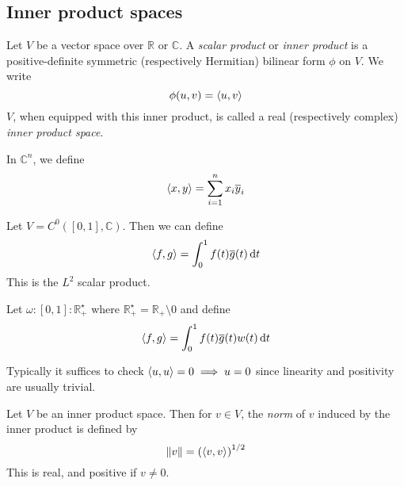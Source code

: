 \subsection{Inner product spaces}
\begin{definition}
	Let \( V \) be a vector space over \( \mathbb R \) or \( \mathbb C \).
	A \textit{scalar product} or \textit{inner product} is a positive-definite symmetric (respectively Hermitian) bilinear form \( \phi \) on \( V \).
	We write
	\[
		\phi(u,v) = \left\langle{u,v}\right\rangle
	\]
	\( V \), when equipped with this inner product, is called a real (respectively complex) \textit{inner product space}.
\end{definition}
\begin{example}
	In \( \mathbb C^n \), we define
	\[
		\left\langle{x,y}\right\rangle = \sum_{i=1}^n x_i \overline y_i
	\]
\end{example}
\begin{example}
	Let \( V = C^0([0,1], \mathbb C) \).
	Then we can define
	\[
		\left\langle{f,g}\right\rangle = \int_0^1 f(t) \overline g(t) \dd{t}
	\]
	This is the \( L^2 \) scalar product.
\end{example}
\begin{example}
	Let \( \omega \colon [0,1] \colon \mathbb R^\star_+ \) where \( \mathbb R^\star_+ = \mathbb R_+ \setminus \qty{0} \) and define
	\[
		\left\langle{f,g}\right\rangle = \int_0^1 f(t) \overline g(t) w(t) \dd{t}
	\]
\end{example}
\begin{remark}
	Typically it suffices to check \( \left\langle{u,u}\right\rangle = 0 \implies u = 0 \) since linearity and positivity are usually trivial.
\end{remark}
\begin{definition}
	Let \( V \) be an inner product space.
	Then for \( v \in V \), the \textit{norm} of \( v \) induced by the inner product is defined by
	\[
		\norm{v} = \qty(\left\langle{v,v}\right\rangle)^{1/2}
	\]
	This is real, and positive if \( v \neq 0 \).
\end{definition}
